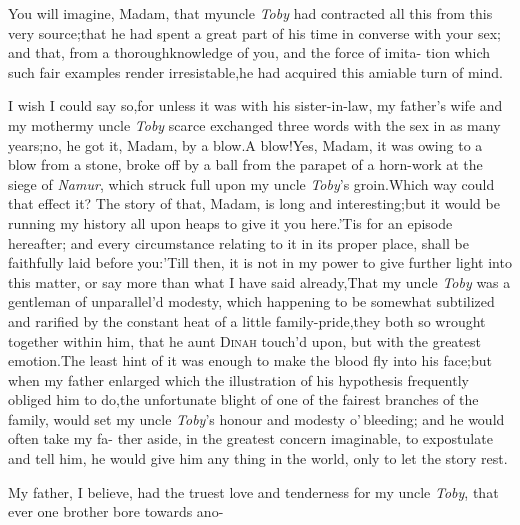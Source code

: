 \documentclass{article}
\begin{document}
You will imagine, Madam, that my\break uncle \textit{Toby} had
contracted all this from this very source;\tsk that he had spent a great
part of his time in converse with your sex; and that, from a
thorough\break knowledge of you, and the force of imita- tion which such
fair examples render irresistable\sic,\tsk he had acquired this amiable
turn of mind.

I wish I could say so,\tsk for unless it was with his
sister-in-law, my father’s wife and my mother\tsh my
uncle \textit{Toby} scarce exchanged three words with the sex in as
many years;\tsh no, he got it, Madam, by a
blow.\tsh A blow!\tsk Yes, Madam, it was owing to a
blow from a stone, broke off by a ball from the parapet of a
horn-work at the siege of \textit{Namur}, which struck full upon my uncle
\textit{Toby}’s groin.\tsk Which way could that effect it?
The story of that, Madam, is long and interesting;\tsk but it
would be running my history all upon heaps to give it you
here.\tsh ’Tis for an episode hereafter; and every
circumstance relating to it in its proper place, shall be
faithfully laid before you:\tsk ’Till then, it is not in my
power to give further light into this matter, or say more than what I have said
already,\tsk That my uncle \textit{Toby} was\break
a gentleman of unparallel’d modesty,\break
which happening to be somewhat
subtilized and rarified by the constant heat of a little
family-pride,\tsk they
both so wrought together within him, that he
aunt \textsc{Dinah} touch’d upon, but with the greatest
emotion.\tsk The least
hint of it was enough to make the blood fly into his face;\tsk but when my father
enlarged
which the illustration of his hypothesis
frequently obliged him to do,\tsh the un\-fortunate blight of one of the fairest
branches of the family, would set my uncle \textit{Toby}’s honour and modesty
o’\,bleed\-ing; and he would often take my fa- ther aside, in the greatest concern
imaginable, to expostulate and tell him, he would give him any thing in the world,
only to let the story rest.

My father, I believe, had the truest love and tenderness for my uncle \textit{Toby},
that ever one brother bore towards ano-\break
{}
\end{document}
